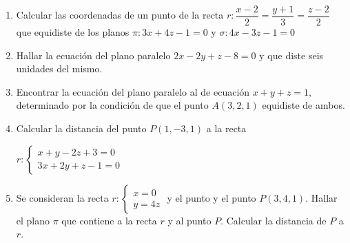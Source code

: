 \begin{enumerate}
\vspace{2mm} 	

\item Calcular las coordenadas de un punto de la recta $r:\dfrac {x-2}2=\dfrac{y+1}3=\dfrac{z-2}2$ que equidiste de los planos $\pi: 3x+4z-1=0$ y $\sigma: 4x-3z-1=0$ 

\vspace{2mm} 	

\item Hallar la ecuación del plano paralelo $2x-2y+z-8=0$ y que diste seis unidades del mismo.

\vspace{2mm} 	
 
\item Encontrar la ecuación del plano paralelo al de ecuación $x+y+z=1$, determinado por la condición de que el punto $A(3,2,1)$ equidiste de ambos. 

\vspace{2mm} 	

\item Calcular la distancia del punto $P(1,- 3,1)$ a la recta 

$r: \begin{cases}x+y-2z+3=0\\3x+2y+z-1=0\end{cases}$

\vspace{2mm} 

\item Se consideran la recta $r: \begin{cases} x=0\\y=4z\end{cases}$ y el punto y el punto $P(3,4,1)$. Hallar el plano $\pi$ que contiene a la recta $r$ y al punto $P$. Calcular la distancia de $P$ a $r$.

\vspace{2mm} 


\end{enumerate}
